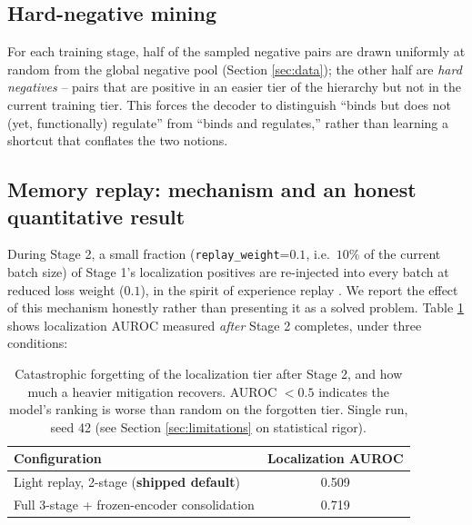\documentclass{article}
\theoremstyle{plain}
\theoremstyle{definition}
\begin{document}
\subsection{Hard-negative mining}
For each training stage, half of the sampled negative pairs are drawn
uniformly at random from the global negative pool (Section \ref{sec:data});
the other half are \emph{hard negatives} -- pairs that are positive in an
easier tier of the hierarchy but not in the current training tier. This
forces the decoder to distinguish ``binds but does not (yet, functionally)
regulate'' from ``binds and regulates,'' rather than learning a shortcut
that conflates the two notions.

\subsection{Memory replay: mechanism and an honest quantitative result}
\label{sec:replay}
During Stage 2, a small fraction (\texttt{replay\_weight}=$0.1$, i.e.\ $10\%$
of the current batch size) of Stage 1's localization positives are re-injected
into every batch at reduced loss weight ($0.1$), in the spirit of experience
replay \cite{rolnick2019replay}. We report the effect of this mechanism
honestly rather than presenting it as a solved problem. Table
\ref{tab:forgetting} shows localization AUROC measured \emph{after} Stage 2
completes, under three conditions:

\begin{table}[t]
\caption{Catastrophic forgetting of the localization tier after Stage 2, and
how much a heavier mitigation recovers. AUROC $<0.5$ indicates the model's
ranking is worse than random on the forgotten tier. Single run, seed 42
(see Section \ref{sec:limitations} on statistical rigor).}
\label{tab:forgetting}
\vskip 0.1in
\begin{center}
\begin{small}
\begin{tabular}{lc}
\toprule
Configuration & Localization AUROC \\
\midrule
Light replay, 2-stage (\textbf{shipped default}) & 0.509 \\
Full 3-stage + frozen-encoder consolidation & 0.719 \\
\bottomrule
\end{tabular}
\end{small}
\end{center}
\end{table}
\end{document}
